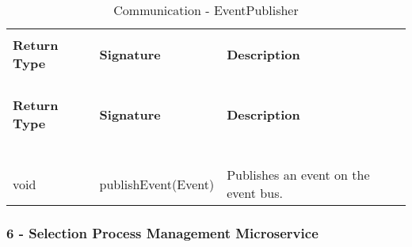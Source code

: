 \begin{longtable}{p{}p{}p{}}
    \caption{Communication - EventPublisher}
    \vspace{0.5em}\\
    \hline
    \vspace{0.5em}\\
    \textbf{Return Type} & \textbf{Signature} & \textbf{Description} \\
    \vspace{0.5em}\\
    \hline
    \vspace{0.5em}\\
    \endfirsthead
    \vspace{0.5em}\\
    \hline
    \vspace{0.5em}\\
    \textbf{Return Type} & \textbf{Signature} & \textbf{Description} \\
    \vspace{0.5em}\\
    \hline
    \vspace{0.5em}\\
    \endhead
    
    \vspace{0.5em}\\
    \hline
    \vspace{0.5em}\\
    \endfoot
    
    \vspace{0.5em}\\
    \hline
    \vspace{0.5em}\\
    \endlastfoot
    
    void &
    publishEvent(Event) &
    Publishes an event on the event bus. \\

\end{longtable}

\subsubsection{6 - Selection Process Management Microservice}

